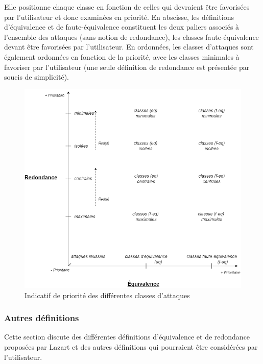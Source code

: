                 Elle positionne chaque classe en fonction de celles qui devraient être favorisées par l'utilisateur et donc examinées en priorité.
                En abscisse, les définitions d'équivalence et de faute-équivalence constituent les deux paliers associés à l'ensemble des attaques (sans notion de redondance), les classes faute-équivalence devant être favorisées par l'utilisateur.
                En ordonnées, les classes d'attaques sont également ordonnées en fonction de la priorité, avec les classes minimales à favoriser par l'utilisateur (une seule définition de redondance est présentée par soucis de simplicité).
            
                \begin{figure}[htb]\centering
                    \includegraphics[scale=0.48]{ch3-lazart/img/equiv-redond-priority.png}
                    \caption{Indicatif de priorité des différentes classes d'attaques}  \label{fig:red-eq-priority}
                \end{figure}
            
            \subsubsection{Autres définitions}
            \label{sec:red-otherdef}
            
                Cette section discute des différentes définitions d'équivalence et de redondance proposées par Lazart et des autres définitions qui pourraient être considérées par l'utilisateur.
                

